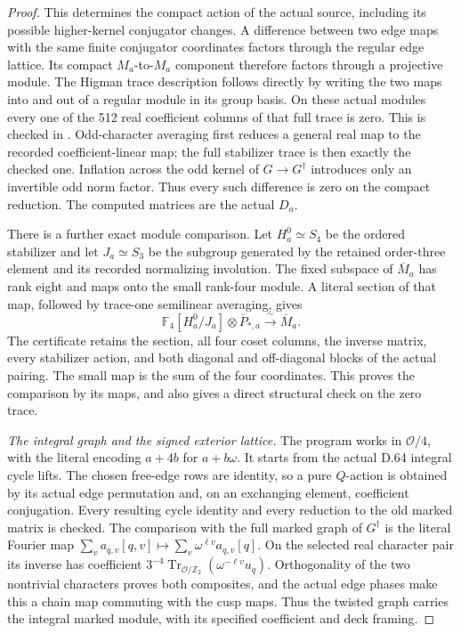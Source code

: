 \begin{proof}
This determines the compact action of the actual source, including
its possible higher-kernel conjugator changes. A difference between
two edge maps with the same finite conjugator coordinates factors
through the regular edge lattice. Its compact \(M_a\)-to-\(M_a\)
component therefore factors through a projective module. The Higman
trace description follows directly by writing the two maps into
and out of a regular module in its group basis. On these actual
modules every one of the 512 real coefficient columns of that full
trace is zero. This is checked in .
Odd-character averaging first reduces a general real map to the
recorded coefficient-linear map; the full stabilizer trace is then
exactly the checked one. Inflation across the odd kernel of
\(G\to G^\dagger\) introduces only an invertible odd norm factor.
Thus every such difference is zero on the compact reduction.
The computed matrices are the actual \(D_a\).

There is a further exact module comparison. Let \(H_a^0\simeq S_4\)
be the ordered stabilizer and let \(J_a\simeq S_3\) be the subgroup
generated by the retained order-three element and its recorded
normalizing involution. The fixed subspace of \(\overline M_a\)
has rank eight and maps onto the small rank-four module. A literal
section of that map, followed by trace-one semilinear averaging,
gives
\[
 \mathbb F_4[H_a^0/J_a]\otimes\overline P_{*,a}
                 \xrightarrow{\ \sim\ }\overline M_a.
 \tag{D.65.15}
\]
The certificate retains the section, all four coset columns, the
inverse matrix, every stabilizer action, and both diagonal and
off-diagonal blocks of the actual pairing. The small map is the
sum of the four coordinates. This proves the comparison by its
maps, and also gives a direct structural check on the zero trace.

\emph{The integral graph and the signed exterior lattice.}
The program  works in
\(\mathcal O/4\), with the literal encoding
\(a+4b\) for \(a+b\omega\). It starts from the actual D.64 integral
cycle lifts. The chosen free-edge rows are identity, so a pure
\(Q\)-action is obtained by its actual edge permutation and, on an
exchanging element, coefficient conjugation. Every resulting cycle
identity and every reduction to the old marked matrix is checked.
The comparison with the full marked graph of \(G^\dagger\) is the
literal Fourier map
\(\sum_v a_{q,v}[q,v]\mapsto
\sum_v\omega^{\ell v}a_{q,v}[q]\). On the selected real character
pair its inverse has coefficient
\(3^{-4}\operatorname{Tr}_{\mathcal O/\mathbb Z_2}
(\omega^{-\ell v}u_q)\). Orthogonality of the two nontrivial
characters proves both composites, and the actual edge phases make
this a chain map commuting with the cusp maps. Thus the twisted
graph carries the integral marked module, with its specified
coefficient and deck framing.


\end{proof}

